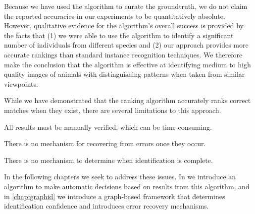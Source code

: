     Because we have used the algorithm to curate the groundtruth, we do not claim the reported accuracies in our
    experiments to be quantitatively absolute. However, qualitative evidence for the algorithm's overall success is
    provided by the facts that (1) we were able to use the algorithm to identify a significant number of
    individuals from different species and (2) our approach provides more accurate rankings than standard instance
    recognition techniques. We therefore make the conclusion that the algorithm is effective at identifying medium
    to high quality images of animals with distinguishing patterns when taken from similar viewpoints.

    While we have demonstrated that the ranking algorithm accurately ranks correct matches when they exist, there
      are several limitations to this approach.
    \begin{enumln}
        \item All results must be manually verified, which can be time-consuming.
        \item There is no mechanism for recovering from errors once they occur.
        \item There is no mechanism to determine when identification is complete.
    \end{enumln}
    In the following chapters we seek to address these issues.
    In  we introduce an algorithm to make automatic decisions based on results from this
      algorithm, and in \cref{chap:graphid} we introduce a graph-based framework that determines identification
      confidence and introduces error recovery mechanisms.
